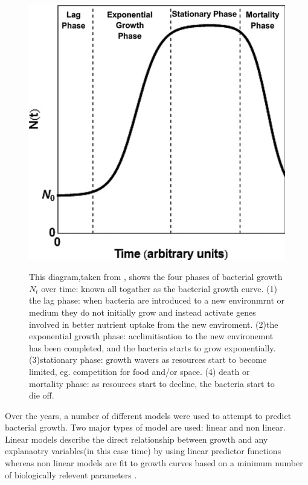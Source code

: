 \documentclass[titlepage]{article}
\begin{document}
 \begin{figure}[H] 
  \centering
  \includegraphics[scale=0.5] {../report/growthcurve.jpeg}
   \label{Figure 1}
    \caption{\footnotesize This diagram,taken from \cite{peleg2011microbial}, shows the four phases of bacterial growth \(N_{t}\) over time: known all togather as the bacterial growth curve. (1) the lag phase: when bacteria are introduced to a new environmrnt or medium they do not initially grow and instead activate genes involved in better nutrient uptake from the new enviroment. (2)the exponential growth phase: acclimitisation to the new environemnt has been completed, and the bacteria starts to grow exponentially. (3)stationary phase: growth wavers as resources start to become limited, eg. competition for food and/or space. (4) death or mortality phase: as resources start to decline, the bacteria start to die off.} 
\end{figure}

Over the years, a number of different models were used to attempt to predict bacterial growth. Two major types of model are used: linear and non linear. Linear models describe the direct relationship between growth and any explanaotry variables(in this case time) by using linear predictor functions whereas non linear models are fit to growth curves based on a minimum number of biologically relevent parameters \cite{grijspeerdt1999estimating}. \\
\end{document}
